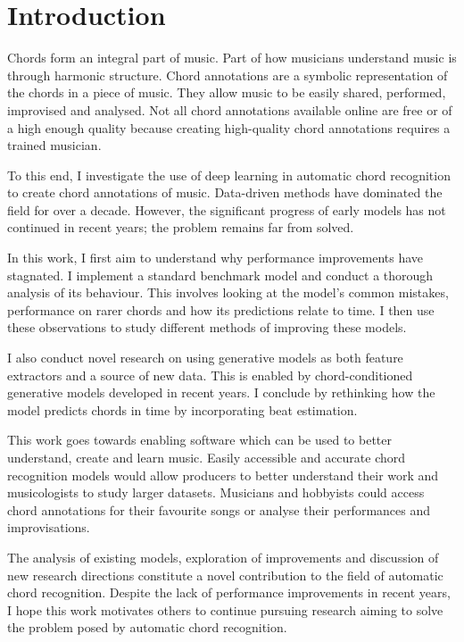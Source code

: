 \chapter{Introduction}

Chords form an integral part of music. Part of how musicians understand music is through harmonic structure. Chord annotations are a symbolic representation of the chords in a piece of music. They allow music to be easily shared, performed, improvised and analysed. Not all chord annotations available online are free or of a high enough quality because creating high-quality chord annotations requires a trained musician. 

To this end, I investigate the use of deep learning in automatic chord recognition to create chord annotations of music. Data-driven methods have dominated the field for over a decade. However, the significant progress of early models has not continued in recent years; the problem remains far from solved.

In this work, I first aim to understand why performance improvements have stagnated. I implement a standard benchmark model and conduct a thorough analysis of its behaviour. This involves looking at the model's common mistakes, performance on rarer chords and how its predictions relate to time. I then use these observations to study different methods of improving these models. 

I also conduct novel research on using generative models as both feature extractors and a source of new data. This is enabled by chord-conditioned generative models developed in recent years. I conclude by rethinking how the model predicts chords in time by incorporating beat estimation. 

This work goes towards enabling software which can be used to better understand, create and learn music. Easily accessible and accurate chord recognition models would allow producers to better understand their work and musicologists to study larger datasets. Musicians and hobbyists could access chord annotations for their favourite songs or analyse their performances and improvisations.

The analysis of existing models, exploration of improvements and discussion of new research directions constitute a novel contribution to the field of automatic chord recognition. Despite the lack of performance improvements in recent years, I hope this work motivates others to continue pursuing research aiming to solve the problem posed by automatic chord recognition. 

